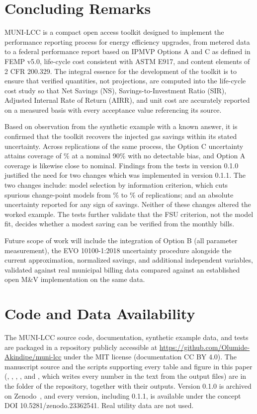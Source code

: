 \section{Concluding Remarks}\label{sec:conclusion}

MUNI-LCC is a compact open access toolkit designed to implement the performance reporting process for energy efficiency upgrades, from metered data to a federal performance report based on IPMVP Options A and C as defined in FEMP v5.0, life-cycle cost consistent with ASTM E917, and content elements of 2 CFR 200.329. The integral essence for the development of the toolkit is to ensure that verified quantities, not projections, are computed into the life-cycle cost study so that Net Savings (NS), Savings-to-Investment Ratio (SIR), Adjusted Internal Rate of Return (AIRR), and unit cost are accurately reported on a measured basis with every acceptance value referencing its source.

Based on observation from the synthetic example with a known answer, it is confirmed that the toolkit recovers the injected gas savings within its stated uncertainty. Across \McReps{} replications of the same process, the Option C uncertainty attains coverage of \McCovNinety\% at a nominal 90\% with no detectable bias, and Option A coverage is likewise close to nominal. Findings from the tests in version 0.1.0 justified the need for two changes which was implemented in version 0.1.1. The two changes include: model selection by information criterion, which cuts spurious change-point models from \BeforeNonThree\% to \AfterNonThree\% of replications; and an absolute uncertainty reported for any sign of savings. Neither of these changes altered the worked example. The tests further validate that the FSU criterion, not the model fit, decides whether a modest saving can be verified from the monthly bills.

Future scope of work will include the integration of Option B (all parameter measurement), the EVO 10100-1:2018 uncertainty procedure alongside the current approximation, normalized savings, and additional independent variables, validated against real municipal billing data compared against an established open M\&V implementation on the same data.

\section*{Code and Data Availability}\label{sec:avail}

The MUNI-LCC source code, documentation, synthetic example data, and tests are packaged in a repository publicly accessible at \url{https://github.com/Olumide-Akindipe/muni-lcc} under the MIT license (documentation CC BY 4.0). The manuscript source and the scripts supporting every table and figure in this paper (, , , , and , which writes every number in the text from the output files) are in the  folder of the repository, together with their outputs. Version 0.1.0 is archived on Zenodo~\cite{munilcc}, and every version, including 0.1.1, is available under the concept DOI 10.5281/zenodo.23362541. Real utility data are not used.

